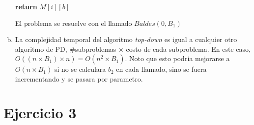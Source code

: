 \documentclass[12pt, a4paper]{report}
\theoremstyle{definition} %
\begin{document}
\begin{enumerate}[a)]
\begin{algorithm}[H]
\begin{algorithmic}[1]
                \State \textbf{return} $M[i][b]$
            \EndFunction
        \end{algorithmic}
    \end{algorithm}
    
    El problema se resuelve con el llamado $Baldes(0, B_1)$

    \item La complejidad temporal del algoritmo \textit{top-down} es igual a cualquier otro algoritmo de PD, \#subproblemas $\times$ costo de cada subproblema. En este caso, $O((n \times B_1) \times n) = O(n^2 \times B_1)$. Noto que esto podria mejorarse a $O(n \times B_1)$ si no se calculara $b_2$ en cada llamado, sino se fuera incrementando y se pasara por parametro.
        
\end{enumerate}

\section*{Ejercicio 3}
\end{document}
